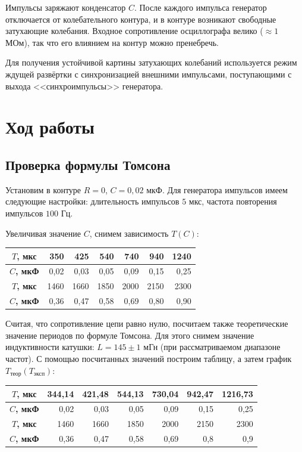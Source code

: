Импульсы заряжают конденсатор $C$. После каждого импульса генератор отключается от колебательного контура, и в контуре возникают свободные затухающие колебания. Входное сопротивление осциллографа велико ($\approx 1$ МОм), так что его влиянием на контур можно пренебречь. 

Для получения устойчивой картины затухающих колебаний используется режим ждущей развёртки с синхронизацией внешними импульсами, поступающими с выхода <<синхроимпульсы>> генератора.

\section{Ход работы}

\subsection{Проверка формулы Томсона}

Установим в контуре $R = 0$, $C = 0,02$ мкФ. Для генератора импульсов имеем следующие настройки: длительность импульсов $5$ мкс, частота повторения импульсов $100$ Гц.

Увеличивая значение $C$, снимем зависимость $T(C)$:

\begin{table}[h!]
    \centering
    \begin{tabular}{|c|r|r|r|r|r|r|}
    \hline
    \textbf{$T$, мкс} & 350  & 425  & 540  & 740  & 940  & 1240 \\ \hline
    \textbf{$C$, мкФ} & 0,02 & 0,03 & 0,05 & 0,09 & 0,15 & 0,25 \\ \hline
    \textbf{$T$, мкс} & 1460 & 1660 & 1850 & 2000 & 2150 & 2300 \\ \hline
    \textbf{$C$, мкФ} & 0,36 & 0,47 & 0,58 & 0,69 & 0,80 & 0,90 \\ \hline
    \end{tabular}
\end{table}

Считая, что сопротивление цепи равно нулю, посчитаем также теоретические значение периодов по формуле Томсона. Для этого снимем значение индуктивности катушки: $L = 145 \pm 1$ мГн (при рассматриваемом диапазоне частот). С помощью посчитанных значений построим таблицу, а затем график $T_{\text{теор}}(T_{\text{эксп}})$:

\begin{table}[h!]
    \centering
    \begin{tabular}{|c|r|r|r|r|r|r|}
    \hline
    \textbf{$T$, мкс} & 344,14 & 421,48 & 544,13 & 730,04 & 942,47 & 1216,73 \\ \hline
    \textbf{$C$, мкФ} & 0,02   & 0,03   & 0,05   & 0,09   & 0,15   & 0,25    \\ \hline
    \textbf{$T$, мкс} & 1460   & 1660   & 1850   & 2000   & 2150   & 2300    \\ \hline
    \textbf{$C$, мкФ} & 0,36   & 0,47   & 0,58   & 0,69   & 0,8    & 0,9     \\ \hline
    \end{tabular}
\end{table}

